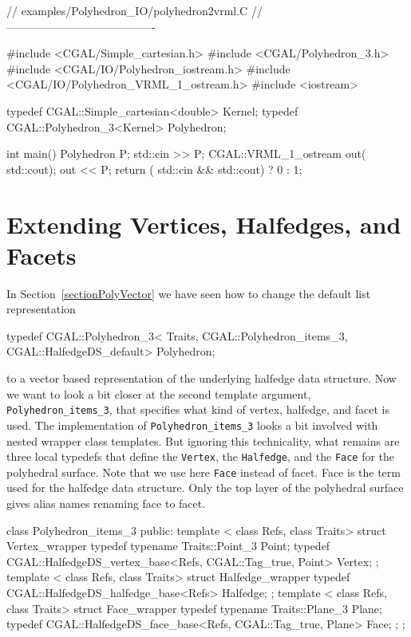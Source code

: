 \begin{ccExampleCode}
// examples/Polyhedron_IO/polyhedron2vrml.C
// ----------------------------------------

#include <CGAL/Simple_cartesian.h>
#include <CGAL/Polyhedron_3.h>
#include <CGAL/IO/Polyhedron_iostream.h>
#include <CGAL/IO/Polyhedron_VRML_1_ostream.h> 
#include <iostream>

typedef CGAL::Simple_cartesian<double> Kernel;
typedef CGAL::Polyhedron_3<Kernel>     Polyhedron;

int main() {
    Polyhedron P;
    std::cin >> P;
    CGAL::VRML_1_ostream out( std::cout);
    out << P;
    return ( std::cin && std::cout) ? 0 : 1;
}
\end{ccExampleCode}



\section{Extending Vertices, Halfedges, and Facets}
\label{sectionPolyExtend}

In Section~\ref{sectionPolyVector} we have seen how to change the 
default list representation

\begin{ccExampleCode}
typedef CGAL::Polyhedron_3< Traits, 
                            CGAL::Polyhedron_items_3, 
                            CGAL::HalfedgeDS_default>      Polyhedron;
\end{ccExampleCode}

to a vector based representation of the underlying halfedge data
structure. Now we want to look a bit closer at the second template argument,
\texttt{Polyhedron\_items\_3}, that specifies what kind of vertex, 
halfedge, and facet is used. The implementation of 
\texttt{Polyhedron\_items\_3} looks a bit involved with nested 
wrapper class templates. But ignoring this technicality, what remains
are three local typedefs that define the \texttt{Vertex}, the
\texttt{Halfedge}, and the \texttt{Face} for the polyhedral surface.
Note that we use here \texttt{Face} instead of facet. Face is the term
used for the halfedge data structure. Only the top layer of the
polyhedral surface gives alias names renaming face to facet.

\begin{ccExampleCode}
class Polyhedron_items_3 {
public:
    template < class Refs, class Traits>
    struct Vertex_wrapper {
        typedef typename Traits::Point_3 Point;
        typedef CGAL::HalfedgeDS_vertex_base<Refs, CGAL::Tag_true, Point> Vertex;
    };
    template < class Refs, class Traits>
    struct Halfedge_wrapper {
        typedef CGAL::HalfedgeDS_halfedge_base<Refs>                      Halfedge;
    };
    template < class Refs, class Traits>
    struct Face_wrapper {
        typedef typename Traits::Plane_3 Plane;
        typedef CGAL::HalfedgeDS_face_base<Refs, CGAL::Tag_true, Plane>   Face;
    };
};
\end{ccExampleCode}

